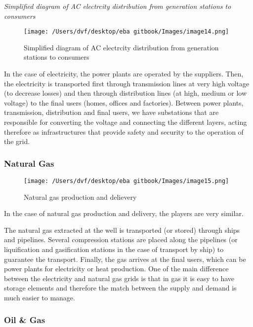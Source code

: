 \documentclass[]{book}
\theoremstyle{definition}
\theoremstyle{definition}
\theoremstyle{definition}
\theoremstyle{remark}
\begin{document}
\emph{Simplified diagram of AC electrcity distribution from generation
stations to consumers}

\begin{figure}[htbp]
\centering
\texttt{[image: /Users/dvf/desktop/eba gitbook/Images/image14.png]}
\caption{Simplified diagram of AC electrcity distribution from
generation stations to consumers}
\end{figure}

In the case of electricity, the power plants are operated by the
suppliers. Then, the electricity is transported first through
transmission lines at very high voltage (to decrease losses) and then
through distribution lines (at high, medium or low voltage) to the final
users (homes, offices and factories). Between power plants,
transmission, distribution and final users, we have substations that are
responsible for converting the voltage and connecting the different
layers, acting therefore as infrastructures that provide safety and
security to the operation of the grid.

\subsubsection{Natural Gas}\label{natural-gas}

\begin{figure}[htbp]
\centering
\texttt{[image: /Users/dvf/desktop/eba gitbook/Images/image15.png]}
\caption{Natural gas production and delievery}
\end{figure}

In the case of natural gas production and delivery, the players are very
similar.

The natural gas extracted at the well is transported (or stored) through
ships and pipelines. Several compression stations are placed along the
pipelines (or liquification and gasification stations in the case of
transport by ship) to guarantee the transport. Finally, the gas arrives
at the final users, which can be power plants for electricity or heat
production. One of the main difference between the electricity and
natural gas grids is that in gas it is easy to have storage elements and
therefore the match between the supply and demand is much easier to
manage.

\subsubsection{Oil \& Gas}\label{oil-gas}
\end{document}
